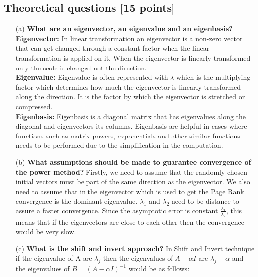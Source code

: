 \documentclass[unicode,11pt,a4paper,oneside,numbers=endperiod,openany]{scrartcl}
\begin{document}
\setassignment
{}

\newline

\assignmentpolicy


\newpage

\subsection{Theoretical questions [15 points]}

\begin{enumerate}
    \item[(a)] \textbf{What are an eigenvector, an eigenvalue and an eigenbasis?} \\
          \textbf{Eigenvector:} In linear transformation an eigenvector is a non-zero vector that can get changed through a constant factor when the linear transformation is applied on it. When the eigenvector is linearly transformed only the scale is changed not the direction. \\

          \textbf{Eigenvalue:} Eigenvalue is often represented with $ \lambda $ which is the multiplying factor which determines how much the eigenvector is linearly transformed along the direction. It is the factor by which the eigenvector is stretched or compressed. \\

          \textbf{Eigenbasis:} Eigenbasis is a diagonal matrix that has eigenvalues along the diagonal and eigenvectors its columns.  Eigenbasis are helpful in cases where functions such as matrix powers, exponentials and other similar functions needs to be performed due to the simplification in the computation.


    \item[(b)] \textbf{What assumptions should be made to guarantee convergence of the power method?}
          Firstly, we need to assume that the randomly chosen initial vectors must be part of the same direction as the eigenvector. We also need to assume that in the eigenvector which is used to get the Page Rank convergence is the dominant eigenvalue. $ \lambda_1$ and $ \lambda_2$ need to be distance to assure a faster convergence. Since the asymptotic error is constant $\frac{\lambda_1}{\lambda_2}$, this means that if the eigenvectors are close to each other then the convergence would be very slow.
    \item[(c)] \textbf{What is the shift and invert approach?}
          In Shift and Invert technique if the eigenvalue of A are $ \lambda_j $ then the eigenvalues of $A - \alpha I $ are $\lambda_j - \alpha$ and the eigenvalues of $ B = (A - \alpha I)^{-1}$ would be as follows:


\end{enumerate}
\end{document}
